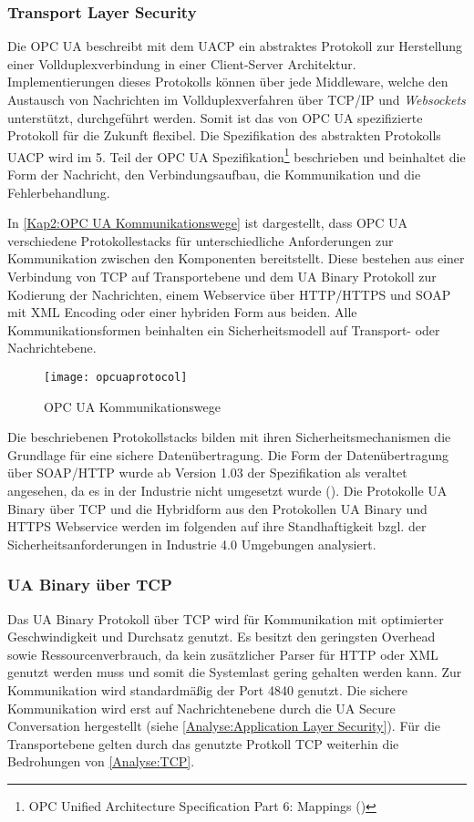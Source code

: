 \subsubsection{Transport Layer Security}
Die \ac{OPC UA} beschreibt mit dem \ac{UACP} ein abstraktes Protokoll zur Herstellung einer Vollduplexverbindung in einer Client-Server Architektur. Implementierungen dieses Protokolls können über jede Middleware, welche den Austausch von Nachrichten im Vollduplexverfahren über \ac{TCP}/\ac{IP} und \textit{Websockets} unterstützt, durchgeführt werden. Somit ist das von \ac{OPC UA} spezifizierte Protokoll für die Zukunft flexibel. Die Spezifikation des abstrakten Protokolls \ac{UACP} wird im 5. Teil der \ac{OPC UA} Spezifikation\footnote{OPC Unified Architecture Specification Part 6: Mappings (\cite{opcpt5})} beschrieben und beinhaltet die Form der Nachricht, den Verbindungsaufbau, die Kommunikation und die Fehlerbehandlung.

In \autoref{Kap2:OPC UA Kommunikationswege} ist dargestellt, dass \ac{OPC UA} verschiedene Protokollestacks für unterschiedliche Anforderungen zur Kommunikation zwischen den Komponenten bereitstellt. Diese bestehen aus einer Verbindung von \ac{TCP} auf Transportebene und dem \ac{UA} Binary Protokoll zur Kodierung der Nachrichten, einem Webservice über \ac{HTTP}/\ac{HTTPS} und \ac{SOAP} mit \ac{XML} Encoding oder einer hybriden Form aus beiden. Alle Kommunikationsformen beinhalten ein Sicherheitsmodell auf Transport- oder Nachrichtebene.

\begin{figure}[h]
  \centering
  \texttt{[image: opcuaprotocol]}
  \caption{OPC UA Kommunikationswege} 
  \label{Kap2:OPC UA Kommunikationswege}
\end{figure}

\clearpage

Die beschriebenen Protokollstacks bilden mit ihren Sicherheitsmechanismen die Grundlage für eine sichere Datenübertragung. Die Form der Datenübertragung über \ac{SOAP}/\ac{HTTP} wurde ab Version 1.03 der Spezifikation als veraltet angesehen, da es in der Industrie nicht umgesetzt wurde (\cite{opcpt5}). Die Protokolle \ac{UA} Binary über \ac{TCP} und die Hybridform aus den Protokollen \ac{UA} Binary und \ac{HTTPS} Webservice werden im folgenden auf ihre Standhaftigkeit bzgl. der Sicherheitsanforderungen in Industrie 4.0 Umgebungen analysiert.

\subsubsection{\ac{UA} Binary über \ac{TCP}}
Das \ac{UA} Binary Protokoll über \ac{TCP} wird für Kommunikation mit optimierter Geschwindigkeit und Durchsatz genutzt. Es besitzt den geringsten Overhead sowie Ressourcenverbrauch, da kein zusätzlicher Parser für \ac{HTTP} oder \ac{XML} genutzt werden muss und somit die Systemlast gering gehalten werden kann. Zur Kommunikation wird standardmäßig der Port 4840 genutzt. Die sichere Kommunikation wird erst auf Nachrichtenebene durch die \ac{UA} Secure Conversation hergestellt (siehe \autoref{Analyse:Application Layer Security}). Für die Transportebene gelten durch das genutzte Protkoll \ac{TCP} weiterhin die Bedrohungen von \autoref{Analyse:TCP}.

